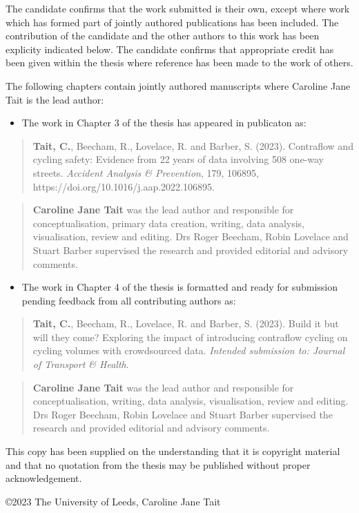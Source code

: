\noindent The candidate confirms that the work submitted is their own, except where work which has formed part of jointly authored publications has been included. The contribution of the candidate and the other authors to this work has been explicity indicated below. The candidate confirms that appropriate credit has been given within the thesis where reference has been made to the work of others. 

The following chapters contain jointly authored manuscripts where Caroline Jane Tait is the lead author:
\begin{itemize}
  \item The work in Chapter 3 of the thesis has appeared in publicaton as:  
\end{itemize}

\begin{quote}
\textbf{Tait, C.}, Beecham, R., Lovelace, R. and Barber, S. (2023). Contraflow and cycling safety: Evidence from 22 years of data involving 508 one-way streets. \emph{Accident Analysis \& Prevention}, 179, 106895, https://doi.org/10.1016/j.aap.2022.106895.
\end{quote}

\begin{quote}
\textbf{Caroline Jane Tait} was the lead author and responsible for conceptualisation, primary data creation, writing, data analysis, visualisation, review and editing. Drs Roger Beecham, Robin Lovelace and Stuart Barber supervised the research and provided editorial and advisory comments.  
\end{quote}

\begin{itemize}
  \item The work in Chapter 4 of the thesis is formatted and ready for submission pending feedback from all contributing authors as:  
\end{itemize}

\begin{quote}
\textbf{Tait, C.}, Beecham, R., Lovelace, R. and Barber, S. (2023). Build it but will they come? Exploring the impact of introducing contraflow cycling on cycling volumes with crowdsourced data. \emph{Intended submission to: Journal of Transport \& Health}.
\end{quote}

\begin{quote}
\textbf{Caroline Jane Tait} was the lead author and responsible for conceptualisation, writing, data analysis, visualisation, review and editing. Drs Roger Beecham, Robin Lovelace and Stuart Barber supervised the research and provided editorial and advisory comments.  
\end{quote}

This copy has been supplied on the understanding that it is copyright material and that no quotation from the thesis may be published without proper acknowledgement. 

\copyright  2023 The University of Leeds, Caroline Jane Tait


